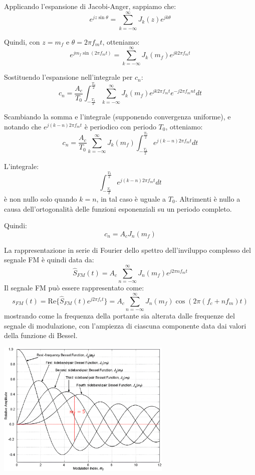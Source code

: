 Applicando l'espansione di Jacobi-Anger, sappiamo che:
\[ e^{j z \sin \theta} = \sum_{k=-\infty}^\infty J_k(z) e^{j k \theta} \]

Quindi, con \( z = m_f \) e \( \theta = 2\pi f_m t \), otteniamo:
\[ e^{j m_f \sin(2\pi f_m t)} = \sum_{k=-\infty}^\infty J_k(m_f) e^{j k 2\pi f_m t} \]


Sostituendo l'espansione nell'integrale per \( c_n \):
\[ c_n = \frac{A_c}{T_0} \int_{-\frac{T_0}{2}}^{\frac{T_0}{2}} \sum_{k=-\infty}^\infty J_k(m_f) e^{j k 2\pi f_m t} e^{-j 2\pi f_m n t} dt \]

Scambiando la somma e l'integrale (supponendo convergenza uniforme), e notando che \( e^{j (k-n) 2\pi f_m t} \) è periodico con periodo \( T_0 \), otteniamo:
\[ c_n = \frac{A_c}{T_0} \sum_{k=-\infty}^\infty J_k(m_f) \int_{-\frac{T_0}{2}}^{\frac{T_0}{2}} e^{j (k-n) 2\pi f_m t} dt \]



L'integrale:
\[ \int_{-\frac{T_0}{2}}^{\frac{T_0}{2}} e^{j (k-n) 2\pi f_m t} dt \]
è non nullo solo quando \( k = n \), in tal caso è uguale a \( T_0 \). Altrimenti è nullo a causa dell'ortogonalità delle funzioni esponenziali su un periodo completo.


Quindi:
\[ c_n = A_c J_n(m_f) \]





La rappresentazione in serie di Fourier dello spettro dell'inviluppo complesso del segnale FM è quindi data da:
\[
\hat{S}_{FM}(t) = A_c \sum_{n=-\infty}^{\infty} J_n(m_f) e^{j 2\pi n f_m t}
\]
Il segnale FM può essere rappresentato come:
\[
s_{FM}(t) = \text{Re}\{ \hat{S}_{FM}(t) e^{j 2\pi f_c t} \} = A_c \sum_{n=-\infty}^{\infty} J_n(m_f) \cos(2\pi (f_c + n f_m) t)
\]
mostrando come la frequenza della portante sia alterata dalle frequenze del segnale di modulazione, con l'ampiezza di ciascuna componente data dai valori della funzione di Bessel.
\begin{center}
    \includegraphics[width=0.625\textwidth]{imgs/bessel1.png}
\end{center}


